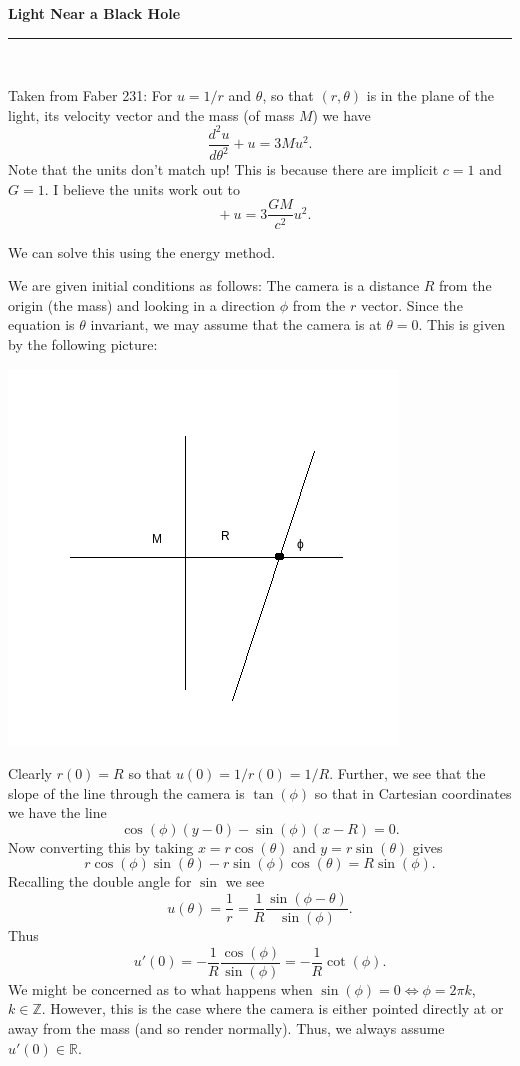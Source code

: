 \documentclass[12pt]{article}
\newcommand{\diff}[2][]{\mathop{\frac{d #1}{d #2}}}
\let\bb\mathbb
\begin{document}
\pagestyle{fancy}

\lhead{ }
\chead{ }

\lfoot{} 
\rfoot{}
\cfoot{}

\begin{center}
 {\bf Light Near a Black Hole}
\end{center}

\hrule

~

Taken from Faber 231: For $u = 1/r$ and $\theta$, so that $(r, \theta)$ is in the 
plane of the light, its velocity vector and the mass (of mass $M$) we have 
$$ \frac{d^2 u}{d\theta^2} + u = 3Mu^2.$$
Note that the units don't match up! This is because there are implicit 
$c = 1$ and $G = 1$. 
I believe the units work out to
$$ \diff[^2u]{\theta^2} + u = 3\frac{GM}{c^2}u^2.$$

We can solve this using the energy method.

We are given initial conditions as follows: The camera is a distance $R$ from the origin 
(the mass)
and looking in a direction $\phi$ from the $r$ vector. Since the equation is $\theta$ 
invariant, we may assume that the camera is at $\theta = 0$. This is given by the following 
picture:

\includegraphics[width=.5\linewidth]{./geodesic.png}

Clearly $r(0) = R$ so that $u(0) = 1/r(0) = 1/R.$ Further, we see that the slope of the
line through the camera is $\tan(\phi)$ so that in Cartesian coordinates we have the 
line 
$$\cos(\phi)(y-0) - \sin(\phi)(x-R)= 0.$$
Now converting this by taking $x = r\cos(\theta)$ and $y = r \sin(\theta)$ gives 
$$r\cos(\phi)\sin(\theta) - r\sin(\phi)\cos(\theta) = R\sin(\phi).$$
Recalling the double angle for $\sin$ we see 
$$u(\theta) = \frac{1}{r} = \frac{1}{R}\frac{\sin(\phi-\theta)}{\sin(\phi)}.$$
Thus 
$$u'(0) = -\frac{1}R \frac{\cos(\phi)}{\sin(\phi)} = -\frac1R \cot(\phi).$$
We might be concerned as to what happens when $\sin(\phi) = 0 \iff \phi = 2\pi k$, $k \in \bb 
Z$. However, this is the case where the camera is either pointed directly at or away
from the mass (and so render normally). Thus, we always assume $u'(0) \in \bb R$.
\end{document}

